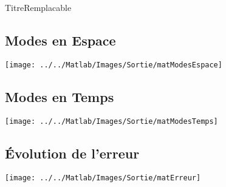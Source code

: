 \documentclass{article}
\begin{document}
TitreRemplacable
\subsection*{Modes en Espace}
\texttt{[image: ../../Matlab/Images/Sortie/matModesEspace]}

\subsection*{Modes en Temps}
\texttt{[image: ../../Matlab/Images/Sortie/matModesTemps]}

\subsection*{Évolution de l'erreur}
\texttt{[image: ../../Matlab/Images/Sortie/matErreur]}
\end{document}
